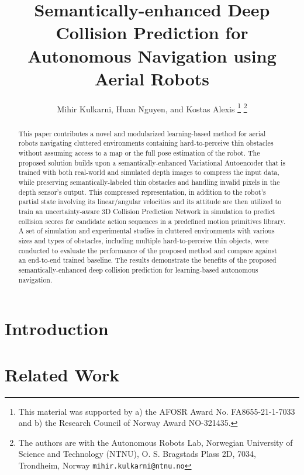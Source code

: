 \documentclass[letterpaper, 10 pt, conference]{ieeeconf}
\title{\LARGE \bf
Semantically-enhanced Deep Collision Prediction for Autonomous Navigation using Aerial Robots
}
\author{Mihir Kulkarni, Huan Nguyen, and Kostas Alexis 
\thanks{This material was supported by a) the AFOSR Award No. FA8655-21-1-7033 and b) the Research Council of Norway Award NO-321435.}%
\thanks{The authors are with the Autonomous Robots Lab, Norwegian University of Science and Technology (NTNU), O. S. Bragstads Plass 2D, 7034, Trondheim, Norway {\tt\small mihir.kulkarni@ntnu.no}}
}
\begin{document}
\maketitle
\thispagestyle{empty}
\pagestyle{empty}


\begin{abstract}
This paper contributes a novel and modularized learning-based method for aerial robots navigating cluttered environments containing hard-to-perceive thin obstacles without assuming access to a map or the full pose estimation of the robot. The proposed solution builds upon a semantically-enhanced Variational Autoencoder that is trained with both real-world and simulated depth images to compress the input data, while preserving semantically-labeled thin obstacles and handling invalid pixels in the depth sensor's output. This compressed representation, in addition to the robot's partial state involving its linear/angular velocities and its attitude are then utilized to train an uncertainty-aware $3$D Collision Prediction Network in simulation to predict collision scores for candidate action sequences in a predefined motion primitives library. A set of simulation and experimental studies in cluttered environments with various sizes and types of obstacles, including multiple hard-to-perceive thin objects, were conducted to evaluate the performance of the proposed method and compare against an end-to-end trained baseline. The results demonstrate the benefits of the proposed semantically-enhanced deep collision prediction for learning-based autonomous navigation.

\end{abstract}


\section{Introduction}\label{sec:intro}


\section{Related Work}\label{sec:related}

\end{document}
